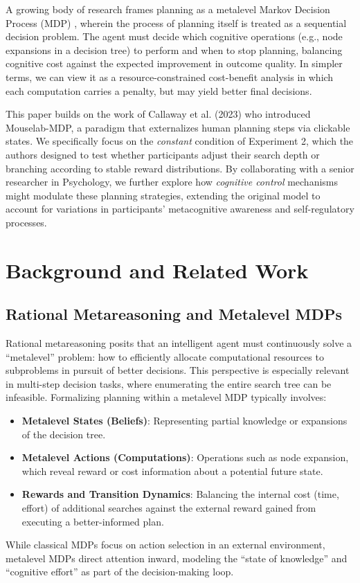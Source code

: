 \documentclass[a4paper,12pt,oneside,article]{memoir}
\begin{document}
A growing body of research frames planning as a metalevel Markov Decision Process (MDP) \cite{Callaway2023rationaluse}, wherein the process of planning itself is treated as a sequential decision problem. The agent must decide which cognitive operations (e.g., node expansions in a decision tree) to perform and when to stop planning, balancing cognitive cost against the expected improvement in outcome quality. In simpler terms, we can view it as a resource-constrained cost-benefit analysis in which each computation carries a penalty, but may yield better final decisions.

This paper builds on the work of Callaway et al. (2023) who introduced Mouselab-MDP, a paradigm that externalizes human planning steps via clickable states. We specifically focus on the \emph{constant} condition of Experiment 2, which the authors designed to test whether participants adjust their search depth or branching according to stable reward distributions. By collaborating with a senior researcher in Psychology, we further explore how \emph{cognitive control} mechanisms might modulate these planning strategies, extending the original model to account for variations in participants’ metacognitive awareness and self-regulatory processes.

\section*{Background and Related Work}
\subsection*{Rational Metareasoning and Metalevel MDPs}
Rational metareasoning posits that an intelligent agent must continuously solve a “metalevel” problem: how to efficiently allocate computational resources to subproblems in pursuit of better decisions. This perspective is especially relevant in multi-step decision tasks, where enumerating the entire search tree can be infeasible. Formalizing planning within a metalevel MDP \cite{griffiths2015rational} typically involves:
\begin{itemize}
    \item \textbf{Metalevel States (Beliefs)}: Representing partial knowledge or expansions of the decision tree.
    \item \textbf{Metalevel Actions (Computations)}: Operations such as node expansion, which reveal reward or cost information about a potential future state.
    \item \textbf{Rewards and Transition Dynamics}: Balancing the internal cost (time, effort) of additional searches against the external reward gained from executing a better-informed plan.
\end{itemize}
While classical MDPs focus on action selection in an external environment, metalevel MDPs direct attention inward, modeling the “state of knowledge” and “cognitive effort” as part of the decision-making loop.
\end{document}
